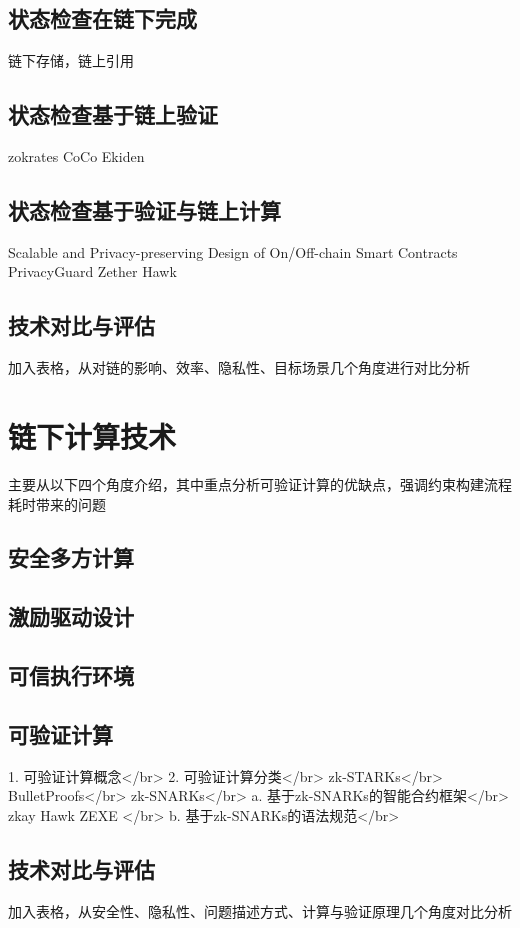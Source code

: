 \subsection{状态检查在链下完成}
链下存储，链上引用

\subsection{状态检查基于链上验证}

zokrates
CoCo
Ekiden

\subsection{状态检查基于验证与链上计算}

Scalable and Privacy-preserving Design of
On/Off-chain Smart Contracts
PrivacyGuard
Zether
Hawk

\subsection{技术对比与评估}

加入表格，从对链的影响、效率、隐私性、目标场景几个角度进行对比分析

\section{链下计算技术}
主要从以下四个角度介绍，其中重点分析可验证计算的优缺点，强调约束构建流程耗时带来的问题

\subsection{安全多方计算}

\subsection{激励驱动设计}

\subsection{可信执行环境}

\subsection{可验证计算}

1. 可验证计算概念</br>
2. 可验证计算分类</br>
zk-STARKs</br>
BulletProofs</br>
zk-SNARKs</br>
a. 基于zk-SNARKs的智能合约框架</br>
zkay Hawk ZEXE </br>
b. 基于zk-SNARKs的语法规范</br>

\subsection{技术对比与评估}

加入表格，从安全性、隐私性、问题描述方式、计算与验证原理几个角度对比分析

